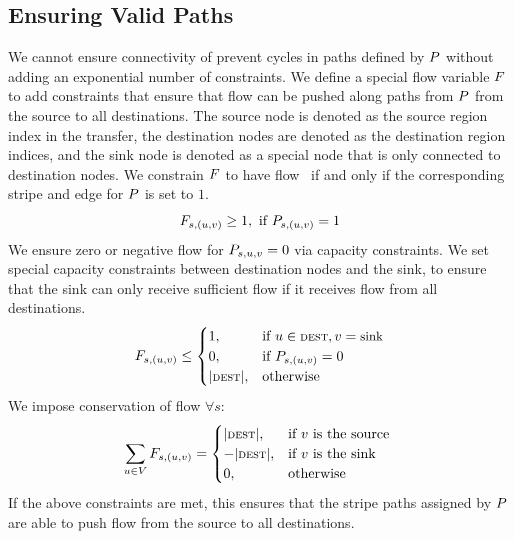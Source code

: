 \subsection{Ensuring Valid Paths}
We cannot ensure connectivity of prevent cycles in paths defined by $\indicator$ without adding an exponential number of constraints. We define a special flow variable $\flow$ to add constraints that ensure that flow can be pushed along paths from $\indicator$ from the source to all destinations.  The source node is denoted as the source region index in the transfer, the destination nodes are denoted as the destination region indices, and the sink node is denoted as a special node that is only connected to destination nodes. 
%
We constrain $\flow$ to have flow~ if and only if the corresponding stripe and edge for $\indicator$ is set to $1$. 
\begin{equation}
    \flow_{s, (u,v)}  \ge 1, \text{ if } \indicator_{s,(u,v)} = 1
\end{equation}
We ensure zero or negative flow 
for $\indicator_{s,u,v} = 0$ via capacity constraints. We set special capacity constraints between destination nodes and the sink, to ensure that the sink can only receive sufficient flow if it receives flow from all destinations. 
\begin{equation}
    \flow_{s, (u, v)} \le 
\begin{cases}
    1,& \text{if } u\in \dest, v= \text{sink} \\
    0,& \text{if } \indicator_{s,(u,v)} = 0 \\
    |\dest|,              & \text{otherwise}  
\end{cases}
\end{equation}
We impose conservation of flow $\forall s$:  
\begin{equation}
    \sum_{u\in V} \flow_{s, (u, v)} = 
\begin{cases}
    |\dest|,& \text{if $v$ is the source \shu{Why v?}} \\
    -|\dest|,              & \text{if $v$ is the sink}  \\
    0,              & \text{otherwise}
\end{cases}
\end{equation}
If the above constraints are met, this ensures that the stripe paths assigned by $\indicator$ are able to push flow from the source to all destinations. 

